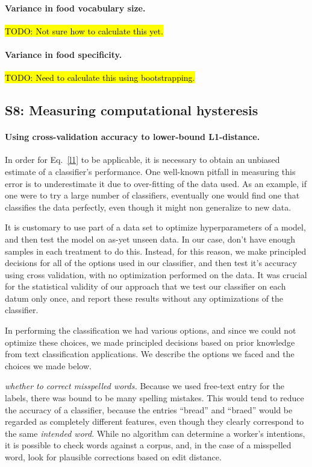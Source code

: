 \documentclass[12pt]{article}
\newcommand{\td}[1]{{\color{blu}\hl{TODO: #1}}}
\begin{document}
	\paragraph{Variance in food vocabulary size.}
	\td{Not sure how to calculate this yet.}

	\paragraph{Variance in food specificity.}
	\td{Need to calculate this using bootstrapping.}


\subsection*{S8: Measuring computational hysteresis}
	\paragraph{Using cross-validation accuracy to lower-bound L1-distance.}
	In order for Eq.~\ref{l1} to be applicable, it is necessary to obtain
	an unbiased estimate of a classifier's performance.  One well-known
	pitfall in measuring this error is to underestimate it due to 
	over-fitting of the data used.  As an example, if one were to try 
	a large number of classifiers, eventually one would find one that
	classifies the data perfectly, even though it might non generalize to
	new data.

	It is customary to use part of a data set to optimize hyperparameters of
	a model, and then test the model on as-yet unseen data.  In our case,
	don't have enough samples in each treatment to do this.  Instead, for 
	this reason, we make principled decisions for all of the options used
	in our classifier, and then test it's accuracy using cross validation,
	with no optimization performed on the data.  It was crucial for 
	the statistical validity of our approach that we test our classifier on 
	each datum only once, and report these results without any optimizations
	of the classifier.

	In performing the classification we had various options, and since we
	could not optimize these choices, we made principled decisions based on
	prior knowledge from text classification applications.  We describe the
	options we faced and the choices we made below.

	\textit{whether to correct misspelled words.}  Because we used free-text
	entry for the labels, there was bound to be many spelling mistakes.
	This would tend to reduce the accuracy of a classifier, because the 
	entries ``bread'' and ``braed'' would be regarded as completely different
	features, even though they clearly correspond to the same 
	\textit{intended word}.  While no algorithm can determine a worker's 
	intentions, it is possible to check words against a corpus, and, in the
	case of a misspelled word, look for plausible corrections based on 
	edit distance.
\end{document}
